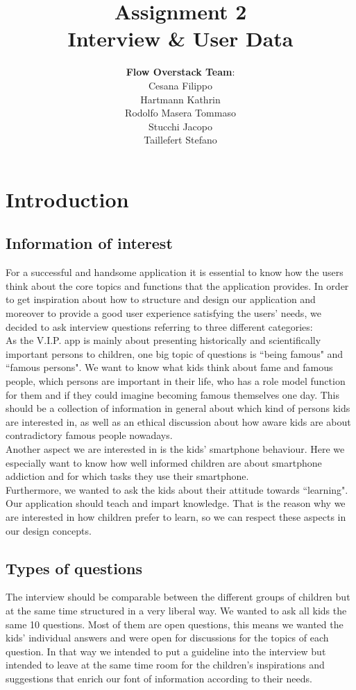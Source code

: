 \documentclass[12pt]{scrartcl}
\title{Assignment 2\\ Interview \& User Data}
\author{\textbf{Flow Overstack Team}:\\ Cesana Filippo\\ 	Hartmann Kathrin\\ Rodolfo Masera Tommaso\\ Stucchi Jacopo\\ Taillefert Stefano}
\date{}
\begin{document}
\maketitle

\section*{Introduction}
	\subsection*{Information of interest}
		For a successful and handsome application it is essential to know how the users think about the core topics and functions that the application provides. In order to get inspiration about how to structure and design our application and moreover to provide a good user experience satisfying the users' needs, we decided to ask interview questions referring to three different categories:\\
		
		As the V.I.P. app is mainly about presenting historically and scientifically important persons to children, one big topic of questions is ``being famous" and ``famous persons". We want to know what kids think about fame and famous people, which persons are important in their life, who has a role model function for them and if they could imagine becoming famous themselves one day. This should be a collection of information in general about which kind of persons kids are interested in, as well as an ethical discussion about how aware kids are about contradictory famous people nowadays.\\
		
		Another aspect we are interested in is the kids' smartphone behaviour. Here we especially want to know how well informed children are about smartphone addiction and for which tasks they use their smartphone.\\
		
		Furthermore, we wanted to ask the kids about their attitude towards ``learning". Our application should teach and impart knowledge. That is the reason why we are interested in how children prefer to learn, so we can respect these aspects in our design concepts.\\
		
	\subsection*{Types of questions}
		The interview should be comparable between the different groups of children but at the same time structured in a very liberal way. We wanted to ask all kids the same 10 questions. Most of them are open questions, this means we wanted the kids' individual answers and were open for discussions for the topics of each question. In that way we intended to put a guideline into the interview but intended to leave at the same time room for the children's inspirations and suggestions that enrich our font of information according to their needs.
\end{document}
